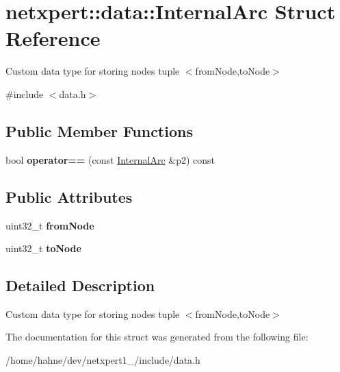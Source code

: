 \hypertarget{structnetxpert_1_1data_1_1InternalArc}{}\section{netxpert\+:\+:data\+:\+:Internal\+Arc Struct Reference}
\label{structnetxpert_1_1data_1_1InternalArc}


Custom data type for storing nodes tuple $<$from\+Node,to\+Node$>$  




{\ttfamily \#include $<$data.\+h$>$}

\subsection*{Public Member Functions}
\begin{DoxyCompactItemize}
\item 
bool {\bfseries operator==} (const \hyperlink{structnetxpert_1_1data_1_1InternalArc}{Internal\+Arc} \&p2) const \hypertarget{structnetxpert_1_1data_1_1InternalArc_aa0d033fb0aa1997571df5f7ea7c2b76c}{}\label{structnetxpert_1_1data_1_1InternalArc_aa0d033fb0aa1997571df5f7ea7c2b76c}

\end{DoxyCompactItemize}
\subsection*{Public Attributes}
\begin{DoxyCompactItemize}
\item 
uint32\+\_\+t {\bfseries from\+Node}\hypertarget{structnetxpert_1_1data_1_1InternalArc_aab63ee5093de1453325a28fd8a0c69ff}{}\label{structnetxpert_1_1data_1_1InternalArc_aab63ee5093de1453325a28fd8a0c69ff}

\item 
uint32\+\_\+t {\bfseries to\+Node}\hypertarget{structnetxpert_1_1data_1_1InternalArc_a10adb9e06d4a970eb43c77fd27ac91c1}{}\label{structnetxpert_1_1data_1_1InternalArc_a10adb9e06d4a970eb43c77fd27ac91c1}

\end{DoxyCompactItemize}


\subsection{Detailed Description}
Custom data type for storing nodes tuple $<$from\+Node,to\+Node$>$ 

The documentation for this struct was generated from the following file\+:\begin{DoxyCompactItemize}
\item 
/home/hahne/dev/netxpert1\+\_/include/data.\+h\end{DoxyCompactItemize}
